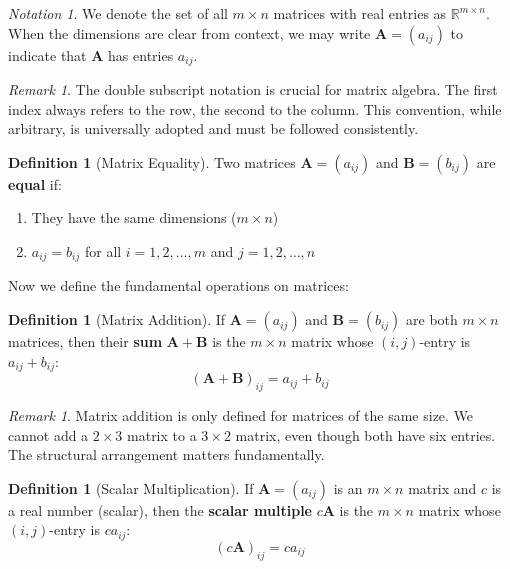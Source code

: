 \documentclass[12pt]{article}
\numberwithin{equation}{section}
\newcommand{\mat}[1]{\mathbf{#1}}        %
\theoremstyle{plain}
\theoremstyle{definition}
\newtheorem{definition}[theorem]{Definition}
\theoremstyle{remark}
\newtheorem{remark}[theorem]{Remark}
\newtheorem{notation}[theorem]{Notation}
\begin{document}
\begin{notation}
We denote the set of all $m \times n$ matrices with real entries as $\mathbb{R}^{m \times n}$. When the dimensions are clear from context, we may write $\mat{A} = (a_{ij})$ to indicate that $\mat{A}$ has entries $a_{ij}$.
\end{notation}

\begin{remark}
The double subscript notation is crucial for matrix algebra. The first index always refers to the row, the second to the column. This convention, while arbitrary, is universally adopted and must be followed consistently.
\end{remark}

\begin{definition}[Matrix Equality]
Two matrices $\mat{A} = (a_{ij})$ and $\mat{B} = (b_{ij})$ are \textbf{equal} if:
\begin{enumerate}
\item They have the same dimensions ($m \times n$)
\item $a_{ij} = b_{ij}$ for all $i = 1, 2, \ldots, m$ and $j = 1, 2, \ldots, n$
\end{enumerate}
\end{definition}

Now we define the fundamental operations on matrices:

\begin{definition}[Matrix Addition]
If $\mat{A} = (a_{ij})$ and $\mat{B} = (b_{ij})$ are both $m \times n$ matrices, then their \textbf{sum} $\mat{A} + \mat{B}$ is the $m \times n$ matrix whose $(i,j)$-entry is $a_{ij} + b_{ij}$:
$$(\mat{A} + \mat{B})_{ij} = a_{ij} + b_{ij}$$
\end{definition}

\begin{remark}
Matrix addition is only defined for matrices of the same size. We cannot add a $2 \times 3$ matrix to a $3 \times 2$ matrix, even though both have six entries. The structural arrangement matters fundamentally.
\end{remark}

\begin{definition}[Scalar Multiplication]
If $\mat{A} = (a_{ij})$ is an $m \times n$ matrix and $c$ is a real number (scalar), then the \textbf{scalar multiple} $c\mat{A}$ is the $m \times n$ matrix whose $(i,j)$-entry is $ca_{ij}$:
$$(c\mat{A})_{ij} = ca_{ij}$$
\end{definition}
\end{document}
